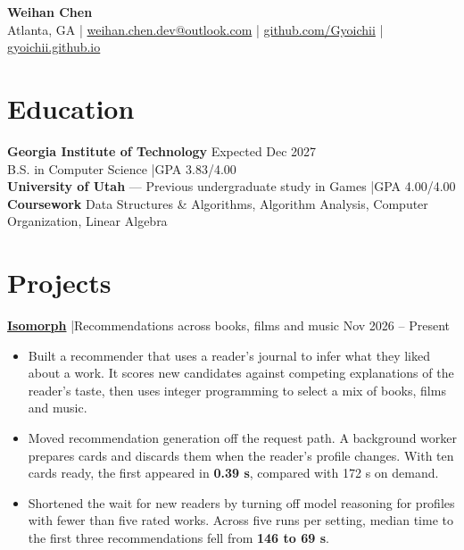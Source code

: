 \documentclass[letterpaper,11pt]{article}
\begin{document}
\fontsize{11.5}{14.6}\selectfont
\begin{center}
{\fontsize{20}{23}\selectfont\bfseries Weihan Chen}\\[3pt]
{\fontsize{10}{12}\selectfont Atlanta, GA \enspace|\enspace
\href{mailto:weihan.chen.dev@outlook.com}{weihan.chen.dev@outlook.com} \enspace|\enspace
\href{https://github.com/Gyoichii}{github.com/Gyoichii} \enspace|\enspace
\href{https://gyoichii.github.io/}{gyoichii.github.io}}
\end{center}
\vspace{-8pt}

\section*{Education}
\textbf{Georgia Institute of Technology} \hfill Expected Dec 2027\\
B.S. in Computer Science \enspace|\enspace GPA 3.83/4.00\\
\textbf{University of Utah} --- Previous undergraduate study in Games \enspace|\enspace GPA 4.00/4.00\\
\textbf{Coursework} \enspace Data Structures \& Algorithms, Algorithm Analysis, Computer Organization, Linear Algebra

\section*{Projects}
\href{https://gyoichii.github.io/projects/isomorph/}{\textbf{Isomorph}} \enspace|\enspace Recommendations across books, films and music \hfill Nov 2026 -- Present
\begin{itemize}
\item Built a recommender that uses a reader's journal to infer what they liked about a work. It scores new candidates against competing explanations of the reader's taste, then uses integer programming to select a mix of books, films and music.
\item Moved recommendation generation off the request path. A background worker prepares cards and discards them when the reader's profile changes. With ten cards ready, the first appeared in \textbf{0.39 s}, compared with 172 s on demand.
\item Shortened the wait for new readers by turning off model reasoning for profiles with fewer than five rated works. Across five runs per setting, median time to the first three recommendations fell from \textbf{146 to 69 s}.
\end{itemize}
\end{document}
